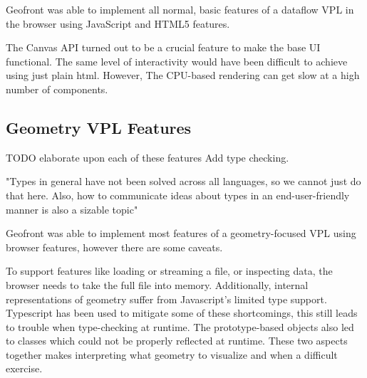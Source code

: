 Geofront was able to implement all normal, basic features of a dataflow VPL in the browser using JavaScript and HTML5 features.

The Canvas API turned out to be a crucial feature to make the base UI functional. 
The same level of interactivity would have been difficult to achieve using just plain html.
However, The CPU-based rendering can get slow at a high number of components. 



\subsection{Geometry VPL Features}

\begin{note}



  
  TODO elaborate upon each of these features
  Add type checking.
  
  "Types in general have not been solved across all languages, so we cannot just do that here. Also, how to communicate ideas about types in an end-user-friendly manner is also a sizable topic" 
\end{note}

Geofront was able to implement most features of a geometry-focused VPL using browser features, however there are some caveats. 

To support features like loading or streaming a file, or inspecting data, the browser needs to take the full file into memory. 
Additionally, internal representations of geometry suffer from Javascript's limited type support.
Typescript has been used to mitigate some of these shortcomings, this still leads to trouble when type-checking at runtime. 
The prototype-based objects also led to classes which could not be properly reflected at runtime.
These two aspects together makes interpreting what geometry to visualize and when a difficult exercise. 

